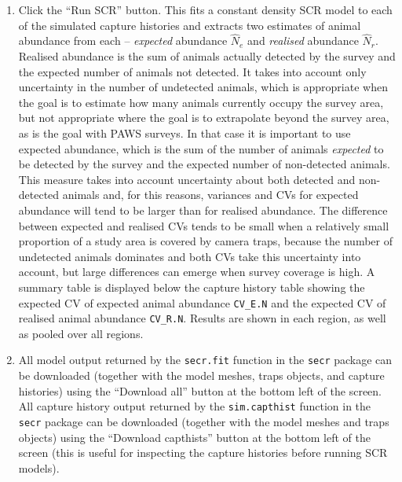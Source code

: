 \documentclass[a4paper,11pt]{article} %
\begin{document}
\begin{enumerate}
\item Click the ``Run SCR'' button. This fits a constant density SCR model to each of the simulated capture histories and extracts two estimates of animal abundance from each -- {\it expected} abundance $\hat{N}_e$ and {\it realised} abundance $\hat{N}_r$. Realised abundance is the sum of animals actually detected by the survey and the expected number of animals not detected. It takes into account only uncertainty in the number of undetected animals, which is appropriate when the goal is to estimate how many animals currently occupy the survey area, but not appropriate where the goal is to extrapolate beyond the survey area, as is the goal with PAWS surveys. In that case it is important to use expected abundance, which is the sum of the number of animals {\it expected} to be detected by the survey and the expected number of non-detected animals. This measure takes into account uncertainty about both detected and non-detected animals and, for this reasons, variances and CVs for expected abundance will tend to be larger than for realised abundance. The difference between expected and realised CVs tends to be small when a relatively small proportion of a study area is covered by camera traps, because the number of undetected animals dominates and both CVs take this uncertainty into account, but large differences can emerge when survey coverage is high. A summary table is displayed below the capture history table showing the expected CV of expected animal abundance \verb!CV_E.N! and the expected CV of realised animal abundance \verb!CV_R.N!. Results are shown in each region, as well as pooled over all regions. 
\item All model output returned by the \texttt{secr.fit} function in the \texttt{secr} package can be downloaded (together with the model meshes, traps objects, and capture histories) using the ``Download all'' button at the bottom left of the screen. All capture history output returned by the \texttt{sim.capthist} function in the \texttt{secr} package can be downloaded (together with the model meshes and traps objects) using the ``Download capthists'' button at the bottom left of the screen (this is useful for inspecting the capture histories before running SCR models).
\end{enumerate}
\end{document}
